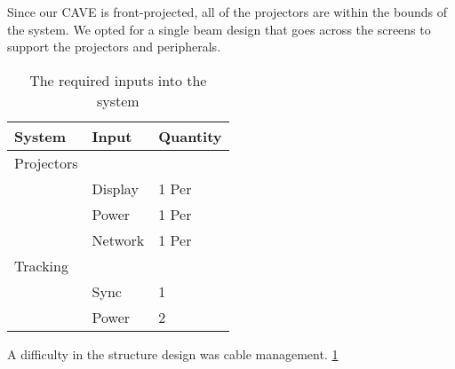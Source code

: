 Since our CAVE is front-projected, all of the projectors are within the bounds of the system. We opted for a single beam design that goes across the screens to support the projectors and peripherals. 

\filbreak
\begin{table}[H]
	\centering
	\renewcommand\arraystretch{0.5}
	\begin{tabular}{l|l|l}
		\hline 
		System & Input & Quantity \\ 
		\hline 
		Projectors	&  			&  			\\ 
					&  Display 	&  1 Per 	\\ 
					&  Power 	&  1 Per 	\\ 
					&  Network 	&  1 Per 	\\
		Tracking	&  			&  			\\
					&  Sync 	&  1 	 	\\ 	
					&  Power 	&  2 	 	\\	
	\end{tabular} 
		
	\caption{The required inputs into the system} \label{table:requiredInputs}
\end{table}

A difficulty in the structure design was cable management. \ref{table:requiredInputs} 

\clearpage
